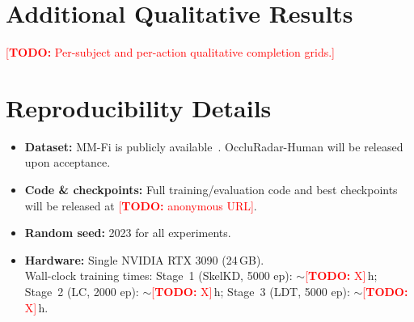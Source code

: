 \documentclass{article}
\newcommand{\todo}[1]{\textcolor{red}{[\textbf{TODO:} #1]}}
\begin{document}
\section{Additional Qualitative Results}
\label{app:extra_qual}

\todo{Per-subject and per-action qualitative completion grids.}

\section{Reproducibility Details}
\label{app:repro}

\begin{itemize}[leftmargin=1.5em,itemsep=2pt]
  \item \textbf{Dataset:} MM-Fi is publicly available~\cite{yang2023mmfi}.
        OccluRadar-Human will be released upon acceptance.
  \item \textbf{Code \& checkpoints:} Full training/evaluation code and best
        checkpoints will be released at \todo{anonymous URL}.
  \item \textbf{Random seed:} 2023 for all experiments.
  \item \textbf{Hardware:} Single NVIDIA RTX 3090 (24\,GB).\\
        Wall-clock training times:
        Stage~1 (SkelKD, 5000 ep): $\sim$\todo{X}\,h;\;
        Stage~2 (LC, 2000 ep): $\sim$\todo{X}\,h;\;
        Stage~3 (LDT, 5000 ep): $\sim$\todo{X}\,h.
\end{itemize}
\end{document}
